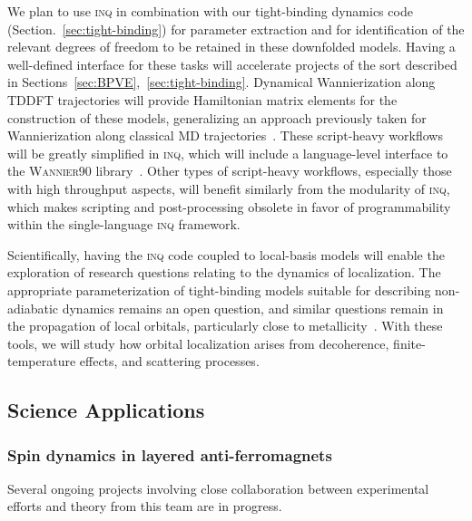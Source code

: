 We plan to use \textsc{inq} in combination with our tight-binding dynamics code (Section.~\ref{sec:tight-binding}) for parameter extraction and for identification of the relevant degrees of freedom to be retained in these downfolded models. Having a well-defined interface for these tasks will accelerate projects of the sort described in Sections~\ref{sec:BPVE},~\ref{sec:tight-binding}. Dynamical Wannierization along TDDFT trajectories will provide Hamiltonian matrix elements for the construction of these models, generalizing an approach previously taken for Wannierization along classical MD trajectories~\cite{Abramovitch2021}. These script-heavy workflows will be greatly simplified in \textsc{inq}, which will include a language-level interface to the \textsc{Wannier90} library~\cite{Mostofi2008}. Other types of script-heavy workflows, especially those with high throughput aspects, will benefit similarly from the modularity of \textsc{inq}, which makes scripting and post-processing obsolete in favor of programmability within the single-language \textsc{inq} framework.

Scientifically, having the \textsc{inq} code coupled to local-basis models will enable the exploration of research questions relating to the dynamics of localization. The appropriate parameterization of tight-binding models suitable for describing non-adiabatic dynamics remains an open question, and similar questions remain in the propagation of local orbitals, particularly close to metallicity~\cite{Yost2019}. With these tools, we will study how orbital localization arises from decoherence, finite-temperature effects, and scattering processes.  

\subsection{Science Applications}
\subsubsection{Spin dynamics in layered anti-ferromagnets}
Several ongoing projects involving close collaboration between experimental efforts and theory from this team are in progress.

